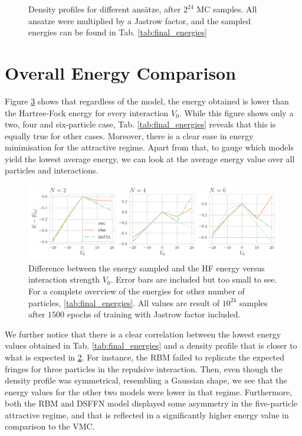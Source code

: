 \begin{figure}[H]
\begin{subfigure}[b]{0.8\textwidth}
    \label{fig:total_n6}
    \end{subfigure}
    \caption{Density profiles for different ansätze, after $2^{24}$ MC samples. All ansatze were multiplied by a Jastrow factor, and the sampled energies can be found in Tab. \ref{tab:final_energies}}
    \label{fig:densities_all}
\end{figure}


\section{Overall Energy Comparison}\label{sec:energy}

Figure \ref{fig:corrlation_e} shows that regardless of the model, the energy obtained is lower than the Hartree-Fock energy for every interaction $V_0$. While this figure shows only a two, four and six-particle case, Tab. \ref{tab:final_energies} reveals that this is equally true for other cases. Moreover, there is a clear ease in energy minimisation for the attractive regime. Apart from that, to gauge which models yield the lowest average energy, we can look at the average energy value over all particles and interactions.

\begin{figure}[H]
    \centering
    \includegraphics[width=\textwidth]{Chapters/Results/N2//total_energy_vs_v0_n6.pdf}
    \caption{Difference between the energy sampled and the HF energy versus interaction strength $V_0$. Error bars are included but too small to see. For a complete overview of the energies for other number of particles, \ref{tab:final_energies}. All values are result of $10^{24}$ samples after $1500$ epochs of training with Jastrow factor included.}
    \label{fig:corrlation_e}
\end{figure}

We further notice that there is a clear correlation between the lowest energy values obtained in Tab. \ref{tab:final_energies} and a density profile that is closer to what is expected in \ref{fig:densities_all}. For instance, the RBM failed to replicate the expected fringes for three particles in the repulsive interaction. Then, even though the density profile was symmetrical, resembling a Gaussian shape, we see that the energy values for the other two models were lower in that regime. Furthermore, both the RBM and DSFFN model displayed some asymmetry in the five-particle attractive regime, and that is reflected in a significantly higher energy value in comparison to the VMC.

